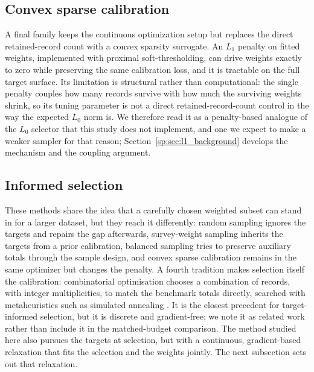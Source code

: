 \subsection{Convex sparse calibration}

A final family keeps the continuous optimization setup but replaces the direct retained-record count
with a convex sparsity surrogate. An $L_1$ penalty on fitted weights, implemented with proximal
soft-thresholding, can drive weights exactly to zero while preserving the same calibration loss, and it
is tractable on the full target surface. Its limitation is structural rather than computational: the
single penalty couples how many records survive with how much the surviving weights shrink, so its
tuning parameter is not a direct retained-record-count control in the way the expected $L_0$ norm is. We
therefore read it as a penalty-based analogue of the $L_0$ selector that this study does not implement,
and one we expect to make a weaker sampler for that reason; Section~\ref{sp:sec:l1_background} develops the
mechanism and the coupling argument.

\subsection{Informed selection}

These methods share the idea that a carefully chosen weighted subset can stand in for a larger
dataset, but they reach it differently: random sampling ignores the targets and repairs the gap
afterwards, survey-weight sampling inherits the targets from a prior calibration, balanced sampling
tries to preserve auxiliary totals through the sample design, and convex sparse calibration remains in
the same optimizer but changes the penalty. A fourth tradition makes selection itself the calibration:
combinatorial optimisation chooses a combination of records, with integer multiplicities, to match the
benchmark totals directly, searched with metaheuristics such as simulated annealing
\citep{kirkpatrick1983, williamson1998, voas2000}. It is the closest precedent for target-informed
selection, but it is discrete and gradient-free; we note it as related work rather than include it in
the matched-budget comparison. The method studied here also pursues the targets at selection, but with
a continuous, gradient-based relaxation that fits the selection and the weights jointly. The next
subsection sets out that relaxation.

